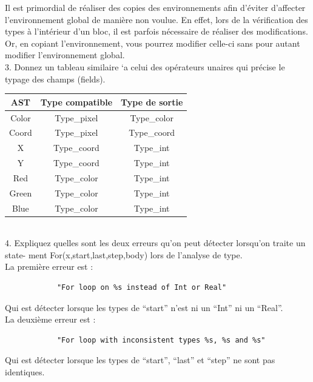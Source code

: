 \documentclass{report}
\begin{document}
    \quad Il est primordial de réaliser des copies des environnements afin d'éviter d'affecter l'environnement global de manière non voulue. En effet, lors de la vérification des types à l'intérieur d'un bloc, il est parfois nécessaire de réaliser des modifications. Or, en copiant l'environnement, vous pourrez modifier celle-ci sans pour autant modifier l'environnement global. \\

    3. Donnez un tableau similaire `a celui des opérateurs unaires qui précise le typage des
        champs (fields).\\

        \begin{tabular}{| c | c | c |}
            \hline
            AST & Type compatible & Type de sortie \\
            \hline
            Color & Type\_pixel & Type\_color \\
            \hline
            Coord & Type\_pixel & Type\_coord \\
            \hline
            X & Type\_coord & Type\_int \\
            \hline
            Y & Type\_coord & Type\_int \\
            \hline
            Red & Type\_color & Type\_int \\
            \hline
            Green & Type\_color & Type\_int \\
            \hline
            Blue & Type\_color & Type\_int \\
            \hline
        \end{tabular}\\

    4. Expliquez quelles sont les deux erreurs qu'on peut détecter lorsqu'on traite un state-
        ment For(x,start,last,step,body) lors de l'analyse de type.\\

        La première erreur est :\\
        \begin{verbatim}
            "For loop on %s instead of Int or Real"
        \end{verbatim}
        \quad Qui est détecter lorsque les types de “start” n’est ni un “Int” ni un “Real”.\\
        \newline
        \newline
        \quad La deuxième erreur est :\\
        \begin{verbatim}
            "For loop with inconsistent types %s, %s and %s"
        \end{verbatim}
        \quad Qui est détecter lorsque les types de “start”, “last” et “step” ne sont pas identiques.\\
\end{document}
